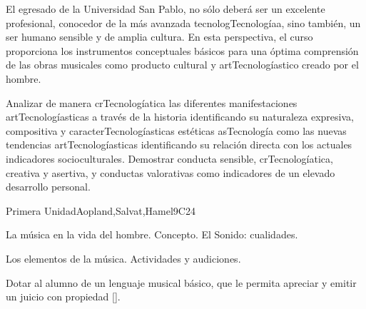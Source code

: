 \begin{syllabus}


\begin{justification}
El egresado de la Universidad San Pablo, no sólo deberá ser un excelente profesional, conocedor de la más avanzada tecnologTecnologíaa, sino también, un ser humano sensible y de amplia cultura. En esta perspectiva, el curso proporciona los instrumentos conceptuales básicos para una óptima comprensión de las obras musicales como producto cultural y artTecnologíastico creado por el hombre.
\end{justification}

\begin{goals}
\item Analizar de manera crTecnologíatica las diferentes manifestaciones artTecnologíasticas a través de la historia identificando su naturaleza expresiva, compositiva y caracterTecnologíasticas estéticas asTecnología como las nuevas tendencias artTecnologíasticas identificando su relación directa con los actuales indicadores socioculturales. Demostrar conducta sensible, crTecnologíatica, creativa y asertiva, y conductas valorativas como indicadores de un elevado desarrollo personal.
\end{goals}

\begin{outcomes}
    \item {}
    \item {}
\end{outcomes}
\begin{competences}
    \item {}
\end{competences}

\begin{unit}{}{Primera Unidad}{Aopland,Salvat,Hamel}{9}{C24}
\begin{topics}
	\item La música en la vida del hombre. Concepto. El Sonido: cualidades.
	\item Los elementos de la música. Actividades y audiciones.
\end{topics}
\begin{learningoutcomes}
	\item Dotar al alumno de un lenguaje musical básico, que le permita apreciar y emitir un juicio con propiedad [\Usage].
\end{learningoutcomes}
\end{unit}


\end{syllabus}
